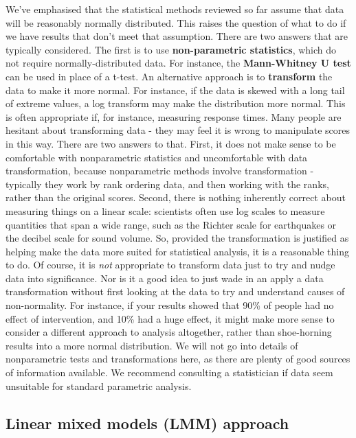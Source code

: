 \documentclass{krantz}
\begin{document}
We've emphasised that the statistical methods reviewed so far assume that data will be reasonably normally distributed. This raises the question of what to do if we have results that don't meet that assumption. There are two answers that are typically considered. The first is to use \textbf{non-parametric statistics}, which do not require normally-distributed data. For instance, the \textbf{Mann-Whitney U test} can be used in place of a t-test. An alternative approach is to \textbf{transform} the data to make it more normal. For instance, if the data is skewed with a long tail of extreme values, a log transform may make the distribution more normal. This is often appropriate if, for instance, measuring response times. Many people are hesitant about transforming data - they may feel it is wrong to manipulate scores in this way. There are two answers to that. First, it does not make sense to be comfortable with nonparametric statistics and uncomfortable with data transformation, because nonparametric methods involve transformation - typically they work by rank ordering data, and then working with the ranks, rather than the original scores. Second, there is nothing inherently correct about measuring things on a linear scale: scientists often use log scales to measure quantities that span a wide range, such as the Richter scale for earthquakes or the decibel scale for sound volume. So, provided the transformation is justified as helping make the data more suited for statistical analysis, it is a reasonable thing to do. Of course, it is \emph{not} appropriate to transform data just to try and nudge data into significance. Nor is it a good idea to just wade in an apply a data transformation without first looking at the data to try and understand causes of non-normality. For instance, if your results showed that 90\% of people had no effect of intervention, and 10\% had a huge effect, it might make more sense to consider a different approach to analysis altogether, rather than shoe-horning results into a more normal distribution. We will not go into details of nonparametric tests and transformations here, as there are plenty of good sources of information available. We recommend consulting a statistician if data seem unsuitable for standard parametric analysis.

\hypertarget{linear-mixed-models-lmm-approach}{%
\subsection{Linear mixed models (LMM) approach}\label{linear-mixed-models-lmm-approach}}
\end{document}

